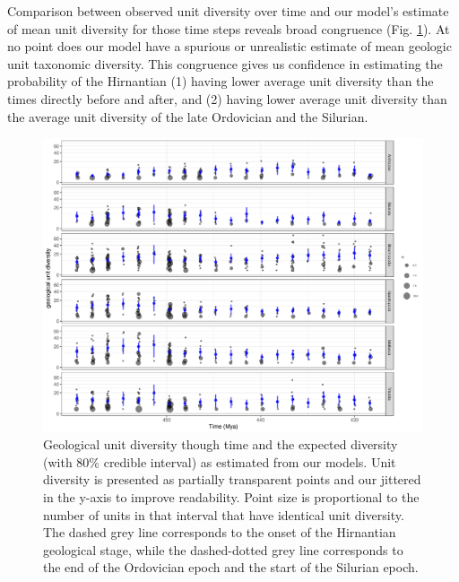 \documentclass[12pt,letterpaper]{article}
\begin{document}
Comparison between observed unit diversity over time and our model's estimate of mean unit diversity for those time steps reveals broad congruence (Fig. \ref{fig:time_div}). At no point does our model have a spurious or unrealistic estimate of mean geologic unit taxonomic diversity. This congruence gives us confidence in estimating the probability of the Hirnantian (1) having lower average unit diversity than the times directly before and after, and (2) having lower average unit diversity than the average unit diversity of the late Ordovician and the Silurian.
\begin{figure}[ht]
  \centering
  \includegraphics[width=\textwidth,height=0.5\textheight,keepaspectratio=true]{figure/unitdiv_time_diversity}
  \caption{Geological unit diversity though time and the expected diversity (with 80\% credible interval) as estimated from our models. Unit diversity is presented as partially transparent points and our jittered in the y-axis to improve readability. Point size is proportional to the number of units in that interval that have identical unit diversity. The dashed grey line corresponds to the onset of the Hirnantian geological stage, while the dashed-dotted grey line corresponds to the end of the Ordovician epoch and the start of the Silurian epoch.}
  \label{fig:time_div}
\end{figure}
\end{document}
